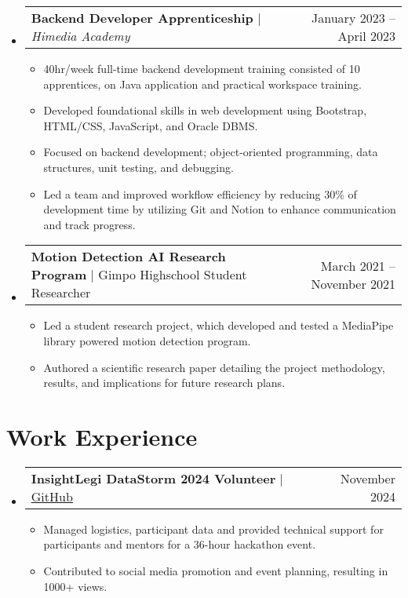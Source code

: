 \documentclass[letterpaper,11pt]{article}
\makeatletter
\newcommand{\resumeItem}[1]{
  \item\small{
    {#1 \vspace{-3pt}}
  }
}
\newcommand{\resumeProjectHeading}[2]{
    \item
    \begin{tabular*}{0.97\textwidth}{l@{\extracolsep{\fill}}r@{\hspace{-0.2in}}}
        \small#1 & #2 \\
    \end{tabular*}\vspace{-7pt}
}
\newcommand{\resumeSubHeadingListStart}{\begin{itemize}[leftmargin=0.00in, rightmargin=-0.2in, label={}]}
\newcommand{\resumeSubHeadingListEnd}{\end{itemize}}
\newcommand{\resumeItemListStart}{\begin{itemize}[leftmargin=0.15in, rightmargin=0.15in]}
\newcommand{\resumeItemListEnd}{\end{itemize}\vspace{-7pt}}
\makeatother
\begin{document}
    \resumeSubHeadingListStart
        \resumeProjectHeading
            {\textbf{Backend Developer Apprenticeship} $|$ \emph{Himedia Academy}}{January 2023 -- April 2023}
            \resumeItemListStart
                \resumeItem{40hr/week full-time backend development training consisted of 10 apprentices, on Java application and practical workspace training.}
                \resumeItem{Developed foundational skills in web development using Bootstrap, HTML/CSS, JavaScript, and Oracle DBMS.}
                \resumeItem{Focused on backend development; object-oriented programming, data structures, unit testing, and debugging.}
                \resumeItem{Led a team and improved workflow efficiency by reducing 30\% of development time by utilizing Git and Notion to enhance communication and track progress.}
                \resumeItemListEnd
        \resumeSubHeadingListEnd

    \resumeSubHeadingListStart
        \resumeProjectHeading
            {\textbf{Motion Detection AI Research Program} $|$ Gimpo Highschool Student Researcher}{March 2021 -- November 2021}
            \resumeItemListStart
                \resumeItem{Led a student research project, which developed and tested a MediaPipe library powered motion detection program.}
                \resumeItem{Authored a scientific research paper detailing the project methodology, results, and implications for future research plans.}
            \resumeItemListEnd
        \resumeSubHeadingListEnd

    \vspace{-1pt}

\section{Work Experience}
    \vspace{-3pt}
    \resumeSubHeadingListStart
        \resumeProjectHeading
            {\textbf{InsightLegi DataStorm 2024 Volunteer} $|$ \href{https://github.com/juhun32/Prison-Break}{\underline{GitHub}}}{November 2024}
            \resumeItemListStart
                \resumeItem{Managed logistics, participant data and provided technical support for participants and mentors for a 36-hour hackathon event.}
                \resumeItem{Contributed to social media promotion and event planning, resulting in 1000+ views.}
                \resumeItemListEnd
        \resumeSubHeadingListEnd
\end{document}
